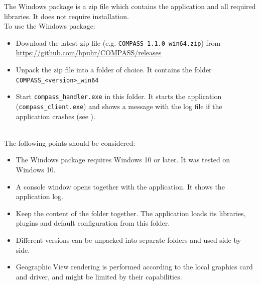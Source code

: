 The Windows package is a zip file which contains the application and all required libraries. It does not require installation. \\

To use the Windows package:

\begin{itemize}
\item Download the latest zip file (e.g. \texttt{COMPASS\_1.1.0\_win64.zip}) from \url{https://github.com/hpuhr/COMPASS/releases}
\item Unpack the zip file into a folder of choice. It contains the folder \texttt{COMPASS\_<version>\_win64}
\item Start \texttt{compass\_handler.exe} in this folder. It starts the application (\texttt{compass\_client.exe}) and shows a message with the log file if the application crashes (see ).
\end{itemize}
\ \\

The following points should be considered:

\begin{itemize}
\item The Windows package requires Windows 10 or later. It was tested on Windows 10.
\item A console window opens together with the application. It shows the application log.
\item Keep the content of the folder together. The application loads its libraries, plugins and default configuration from this folder.
\item Different versions can be unpacked into separate folders and used side by side.
\item Geographic View rendering is performed according to the local graphics card and driver, and might be limited by their capabilities.
\end{itemize}
